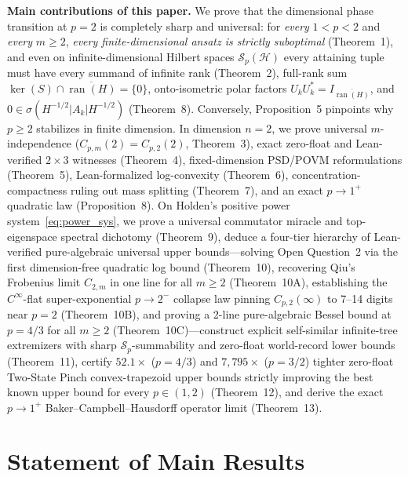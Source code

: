 \documentclass[10pt,letterpaper]{article}
\newcommand{\Hilb}{\mathcal{H}}
\newcommand{\Sp}{\mathcal{S}_p}
\newcommand{\ran}{\operatorname{ran}}
\begin{document}
\medskip
\textbf{Main contributions of this paper.}
We prove that the dimensional phase transition at $p = 2$ is completely sharp and universal: for \emph{every} $1 < p < 2$ and \emph{every} $m \ge 2$, \emph{every finite-dimensional ansatz is strictly suboptimal} (Theorem~1), and even on infinite-dimensional Hilbert spaces $\Sp(\Hilb)$ every attaining tuple must have every summand of infinite rank (Theorem~2), full-rank sum $\ker(S) \cap \overline{\ran(H)} = \{0\}$, onto-isometric polar factors $U_k U_k^* = I_{\overline{\ran(H)}}$, and $0 \in \sigma(H^{-1/2}|A_k|H^{-1/2})$ (Theorem~8). Conversely, Proposition~5 pinpoints why $p \ge 2$ stabilizes in finite dimension. In dimension $n = 2$, we prove universal $m$-independence ($C_{p,m}(2) = C_{p,2}(2)$, Theorem~3), exact zero-float and Lean-verified $2\times 3$ witnesses (Theorem~4), fixed-dimension PSD/POVM reformulations (Theorem~5), Lean-formalized log-convexity (Theorem~6), concentration-compactness ruling out mass splitting (Theorem~7), and an exact $p \to 1^+$ quadratic law (Proposition~8). On Holden's positive power system~\eqref{eq:power_sys}, we prove a universal commutator miracle and top-eigenspace spectral dichotomy (Theorem~9), deduce a four-tier hierarchy of Lean-verified pure-algebraic universal upper bounds—solving Open Question~2 via the first dimension-free quadratic log bound (Theorem~10), recovering Qiu's Frobenius limit $C_{2,m}$ in one line for all $m \ge 2$ (Theorem~10A), establishing the $C^\infty$-flat super-exponential $p \to 2^-$ collapse law pinning $C_{p,2}(\infty)$ to 7--14 digits near $p = 2$ (Theorem~10B), and proving a 2-line pure-algebraic Bessel bound at $p = 4/3$ for all $m \ge 2$ (Theorem~10C)—construct explicit self-similar infinite-tree extremizers with sharp $\Sp$-summability and zero-float world-record lower bounds (Theorem~11), certify $52.1\times$ ($p = 4/3$) and $7{,}795\times$ ($p = 3/2$) tighter zero-float Two-State Pinch convex-trapezoid upper bounds strictly improving the best known upper bound for every $p \in (1, 2)$ (Theorem~12), and derive the exact $p \to 1^+$ Baker--Campbell--Hausdorff operator limit (Theorem~13).

\section{Statement of Main Results}
\end{document}
